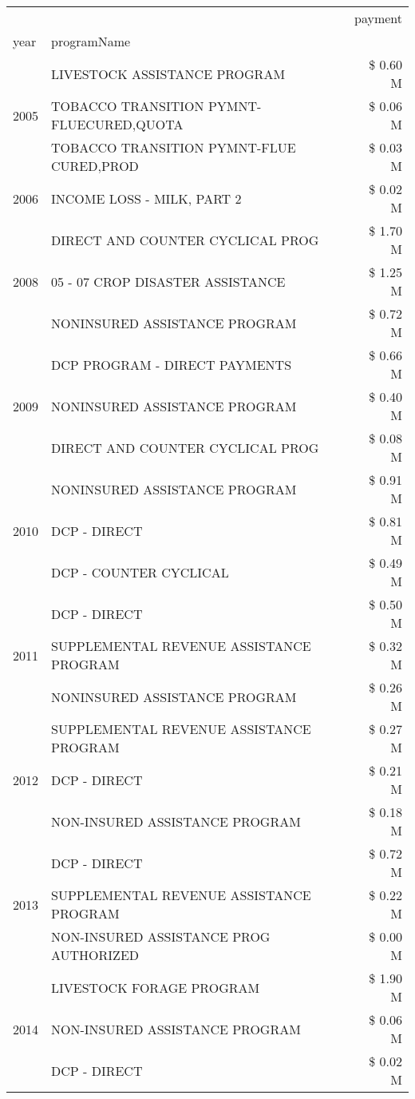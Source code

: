 \begin{tabular}{llr}
\toprule
 &  & payment \\
year & programName &  \\
\midrule
\multirow[t]{3}{*}{2005} & LIVESTOCK ASSISTANCE PROGRAM & \$ 0.60 M \\
 & TOBACCO TRANSITION PYMNT-FLUECURED,QUOTA & \$ 0.06 M \\
 & TOBACCO TRANSITION PYMNT-FLUE CURED,PROD & \$ 0.03 M \\
\cline{1-3}
2006 & INCOME LOSS - MILK, PART 2 & \$ 0.02 M \\
\cline{1-3}
\multirow[t]{3}{*}{2008} & DIRECT AND COUNTER CYCLICAL PROG & \$ 1.70 M \\
 & 05 - 07 CROP DISASTER ASSISTANCE & \$ 1.25 M \\
 & NONINSURED ASSISTANCE PROGRAM & \$ 0.72 M \\
\cline{1-3}
\multirow[t]{3}{*}{2009} & DCP PROGRAM - DIRECT PAYMENTS & \$ 0.66 M \\
 & NONINSURED ASSISTANCE PROGRAM & \$ 0.40 M \\
 & DIRECT AND COUNTER CYCLICAL PROG & \$ 0.08 M \\
\cline{1-3}
\multirow[t]{3}{*}{2010} & NONINSURED ASSISTANCE PROGRAM & \$ 0.91 M \\
 & DCP - DIRECT & \$ 0.81 M \\
 & DCP - COUNTER CYCLICAL & \$ 0.49 M \\
\cline{1-3}
\multirow[t]{3}{*}{2011} & DCP - DIRECT & \$ 0.50 M \\
 & SUPPLEMENTAL REVENUE ASSISTANCE PROGRAM & \$ 0.32 M \\
 & NONINSURED ASSISTANCE PROGRAM & \$ 0.26 M \\
\cline{1-3}
\multirow[t]{3}{*}{2012} & SUPPLEMENTAL REVENUE ASSISTANCE PROGRAM & \$ 0.27 M \\
 & DCP - DIRECT & \$ 0.21 M \\
 & NON-INSURED ASSISTANCE PROGRAM & \$ 0.18 M \\
\cline{1-3}
\multirow[t]{3}{*}{2013} & DCP - DIRECT & \$ 0.72 M \\
 & SUPPLEMENTAL REVENUE ASSISTANCE PROGRAM & \$ 0.22 M \\
 & NON-INSURED ASSISTANCE PROG AUTHORIZED & \$ 0.00 M \\
\cline{1-3}
\multirow[t]{3}{*}{2014} & LIVESTOCK FORAGE PROGRAM & \$ 1.90 M \\
 & NON-INSURED ASSISTANCE PROGRAM & \$ 0.06 M \\
 & DCP - DIRECT & \$ 0.02 M \\

\end{tabular}
